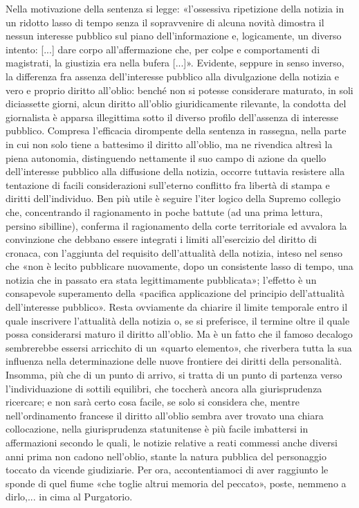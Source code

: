 Nella motivazione della sentenza si legge: «l’ossessiva ripetizione della notizia in un ridotto lasso di tempo senza il sopravvenire di alcuna novità dimostra il nessun interesse pubblico sul piano dell’informazione e, logicamente, un diverso intento: [...] dare corpo all’affermazione che, per colpe e comportamenti di magistrati, la giustizia era nella bufera [...]».
Evidente, seppure in senso inverso, la differenza fra assenza dell’interesse pubblico alla divulgazione della notizia e vero e proprio diritto all’oblio: benché non si potesse considerare maturato, in soli diciassette giorni, alcun diritto all’oblio giuridicamente rilevante, la condotta del giornalista è apparsa illegittima sotto il diverso profilo dell’assenza di interesse pubblico.
Compresa l’efficacia dirompente della sentenza in rassegna, nella parte in cui non solo tiene a battesimo il diritto all’oblio, ma ne rivendica altresì la piena autonomia, distinguendo nettamente il suo campo di azione da quello dell’interesse pubblico alla diffusione della notizia, occorre tuttavia resistere alla tentazione di facili considerazioni sull’eterno conflitto fra libertà di stampa e diritti dell’individuo.
Ben più utile è seguire l’iter logico della Supremo collegio che, concentrando il ragionamento in poche battute (ad una prima lettura, persino sibilline), conferma il ragionamento della corte territoriale ed avvalora la convinzione che debbano essere integrati i limiti all’esercizio del diritto di cronaca, con l’aggiunta del requisito dell’attualità della notizia, inteso nel senso che «non è lecito pubblicare nuovamente, dopo un consistente lasso di tempo, una notizia che in passato era stata legittimamente pubblicata»; l’effetto è un consapevole superamento della «pacifica applicazione del principio dell’attualità dell’interesse pubblico».
Resta ovviamente da chiarire il limite temporale entro il quale inscrivere l’attualità della notizia o, se si preferisce, il termine oltre il quale possa considerarsi maturo il diritto all’oblio.
Ma è un fatto che il famoso decalogo sembrerebbe essersi arricchito di un «quarto elemento», che riverbera tutta la sua influenza nella determinazione delle nuove frontiere dei diritti della personalità. Insomma, più che di un punto di arrivo, si tratta di un punto di partenza verso l’individuazione di sottili equilibri, che toccherà ancora alla giurisprudenza ricercare; e non sarà certo cosa facile, se solo si considera che, mentre nell’ordinamento francese il diritto all’oblio sembra aver trovato una chiara collocazione, nella giurisprudenza statunitense è più facile imbattersi in affermazioni secondo le quali, le notizie relative a reati commessi anche diversi anni prima non cadono nell’oblio, stante la natura pubblica del personaggio toccato da vicende giudiziarie.
Per ora, accontentiamoci di aver raggiunto le sponde di quel fiume «che toglie altrui memoria del peccato», poste, nemmeno a dirlo,... in cima al Purgatorio.

